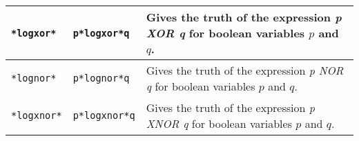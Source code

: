 \documentclass{article}
\begin{document}
\begin{center}
\begin{longtable}{llm{8cm}}
\midrule
\begin{lstlisting}
*logxor*
\end{lstlisting} &
\begin{lstlisting}
p*logxor*q
\end{lstlisting} & Gives the truth of the expression \emph{ p XOR q} for boolean variables \(p\) and \(q\).\\
\midrule
\begin{lstlisting}
*lognor*
\end{lstlisting} &
\begin{lstlisting}
p*lognor*q
\end{lstlisting} & Gives the truth of the expression \emph{ p NOR q} for boolean variables \(p\) and \(q\).\\
\midrule
\begin{lstlisting}
*logxnor*
\end{lstlisting} &
\begin{lstlisting}
p*logxnor*q
\end{lstlisting} & Gives the truth of the expression \emph{ p XNOR q} for boolean variables \(p\) and \(q\).\\

\bottomrule
\end{longtable}
\end{center}
\end{document}
